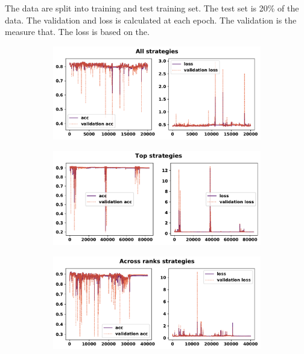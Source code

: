 The data are split into training and test training set. The test set is
20\% of the data. The validation and loss is calculated at each epoch.
The validation is the measure that. The loss is based on the.


\begin{figure}[!htbp]
    \begin{subfigure}{\textwidth}
    \centering
    \includegraphics[width=.8\textwidth]{src/chapters/07/img/validation_plot_all_strategies.pdf}
    \end{subfigure}\hfill
    \begin{subfigure}{\textwidth}
    \centering
    \includegraphics[width=.8\textwidth]{src/chapters/07/img/validation_plot_top_strategies.pdf}
    \end{subfigure}
    \begin{subfigure}{\textwidth}
    \centering
    \includegraphics[width=.8\textwidth]{src/chapters/07/img/validation_plot_across_ranks_strategies.pdf}
    \end{subfigure}
    \begin{subfigure}{\textwidth}

\end{subfigure}
\end{figure}
